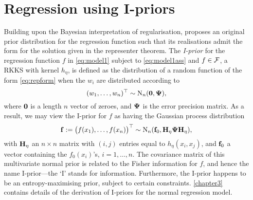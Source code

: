 \documentclass[11pt,twoside,openright,showframe]{report}
\begin{document}
\section{Regression using I-priors}
\label{sec:introregiprior}

Building upon the Bayesian interpretation of regularisation, \citet{bergsma2017} proposes an original prior distribution for the regression function such that its realisations admit the form for the solution given in the representer theorem.
The \emph{I-prior} for the regression function $f$ in \cref{eq:model1} subject to \cref{eq:model1ass} and $f\in{\mathcal F}$, a RKKS with kernel $h_\eta$, is defined as the distribution of a random function of the form \cref{eq:repform} when the $w_i$ are distributed according to 
\[
  (w_1,\dots,w_n)^\top \sim \operatorname{N}_n({\mathbf 0},{\bm\Psi}),
\]
where ${\mathbf 0}$ is a length $n$ vector of zeroes, and ${\bm\Psi}$ is the error precision matrix.
As a result, we may view the I-prior for $f$ as having the Gaussian process distribution
\begin{align}\label{eq:iprior}
  {\mathbf f} := \big(f(x_1),\dots,f(x_n) \big)^\top \sim \operatorname{N}_n({\mathbf f}_0, {\mathbf H}_\eta{\bm\Psi}{\mathbf H}_\eta),
\end{align}
with ${\mathbf H}_{\eta}$ an $n \times n$ matrix with $(i,j)$ entries equal to $h_\eta(x_i,x_j)$, and ${\mathbf f}_0$ a vector containing the $f_0(x_i)$'s, $i=1,\dots,n$.
The covariance matrix of this multivariate normal prior is related to the Fisher information for $f$, and hence the name I-prior---the `I' stands for information.
Furthermore, the I-prior happens to be an entropy-maximising prior, subject to certain constraints.
\cref{chapter3} contains details of the derivation of I-priors for the normal regression model.
\end{document}
